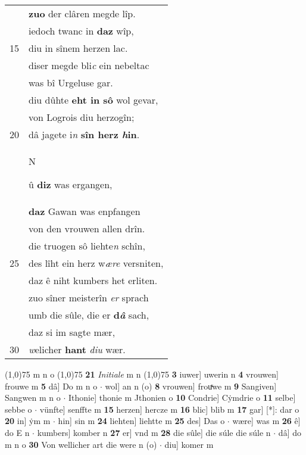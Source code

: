 \documentclass[8pt,a4paper,notitlepage]{article}
\begin{document}
\begin{table}[ht]
\begin{minipage}[t]{0.5\linewidth}
\begin{tabular}{rl}
 & \textbf{zuo} der clâren megde lîp.\\ 
 & iedoch twanc in \textbf{daz} wîp,\\ 
15 & diu in sînem herzen lac.\\ 
 & diser megde bli\textit{c} ein nebeltac\\ 
 & was bî Urgeluse gar.\\ 
 & diu dûhte \textbf{eht in sô} wol gevar,\\ 
 & von Logrois diu herzogîn;\\ 
20 & dâ jagete i\textit{n} \textbf{sîn herz \textit{h}in}.\\ 
 & \begin{large}N\end{large}û \textbf{diz} was ergangen,\\ 
 & \textbf{daz} Gawan was enpfangen\\ 
 & von den vrouwen allen drîn.\\ 
 & die truogen sô liehte\textit{n} schîn,\\ 
25 & des lîht ein herz w\textit{ære} versniten,\\ 
 & daz ê niht kumbers het erliten.\\ 
 & zuo sîner meisterîn \textit{er} sprach\\ 
 & umb die sûle, die er \textbf{d\textit{â}} sach,\\ 
 & daz si im sagte mær,\\ 
30 & \textit{w}elicher \textbf{hant} \textit{diu} wær.\\ 
\end{tabular}
\scriptsize
\line(1,0){75} \newline
m n o \newline
\line(1,0){75} \newline
\textbf{21} \textit{Initiale} m n  \newline
\line(1,0){75} \newline
\textbf{3} iuwer] uwerin n \textbf{4} vrouwen] frouwe m \textbf{5} dâ] Do m n o  $\cdot$ wol] an n (o) \textbf{8} vrouwen] frouͯwe m \textbf{9} Sangiven] Sangwen m n o  $\cdot$ Ithonie] thonie m Jthonien o \textbf{10} Condrie] Cẏmdrie o \textbf{11} selbe] sebbe o  $\cdot$ vünfte] senffte m \textbf{15} herzen] hercze m \textbf{16} blic] blib m \textbf{17} gar] [*]: dar o \textbf{20} in] ẏm m  $\cdot$ hin] sin m \textbf{24} liehten] liehtte m \textbf{25} des] Das o  $\cdot$ wære] was m \textbf{26} ê] do E n  $\cdot$ kumbers] komber n \textbf{27} er] vnd m \textbf{28} die sûle] die súle die súle n  $\cdot$ dâ] do m n o \textbf{30} Von wellicher art die were n (o)  $\cdot$ diu] komer m \newline
\end{minipage}
\end{table}
\end{document}
